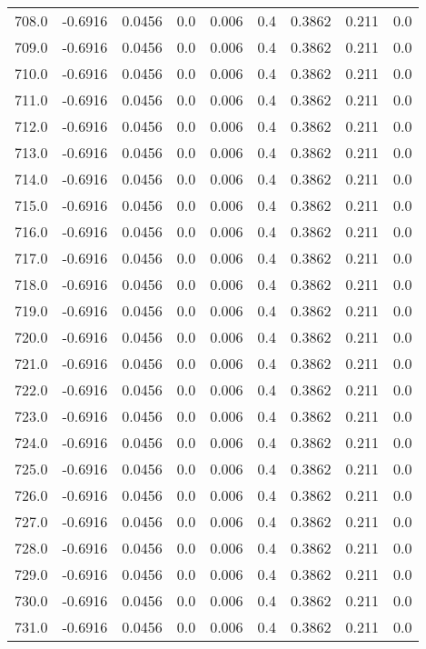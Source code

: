\begin{longtable}{lrrrrrrrr}
708.0 & -0.6916 & 0.0456 & 0.0 & 0.006 & 0.4 & 0.3862 & 0.211 & 0.0 \\
709.0 & -0.6916 & 0.0456 & 0.0 & 0.006 & 0.4 & 0.3862 & 0.211 & 0.0 \\
710.0 & -0.6916 & 0.0456 & 0.0 & 0.006 & 0.4 & 0.3862 & 0.211 & 0.0 \\
711.0 & -0.6916 & 0.0456 & 0.0 & 0.006 & 0.4 & 0.3862 & 0.211 & 0.0 \\
712.0 & -0.6916 & 0.0456 & 0.0 & 0.006 & 0.4 & 0.3862 & 0.211 & 0.0 \\
713.0 & -0.6916 & 0.0456 & 0.0 & 0.006 & 0.4 & 0.3862 & 0.211 & 0.0 \\
714.0 & -0.6916 & 0.0456 & 0.0 & 0.006 & 0.4 & 0.3862 & 0.211 & 0.0 \\
715.0 & -0.6916 & 0.0456 & 0.0 & 0.006 & 0.4 & 0.3862 & 0.211 & 0.0 \\
716.0 & -0.6916 & 0.0456 & 0.0 & 0.006 & 0.4 & 0.3862 & 0.211 & 0.0 \\
717.0 & -0.6916 & 0.0456 & 0.0 & 0.006 & 0.4 & 0.3862 & 0.211 & 0.0 \\
718.0 & -0.6916 & 0.0456 & 0.0 & 0.006 & 0.4 & 0.3862 & 0.211 & 0.0 \\
719.0 & -0.6916 & 0.0456 & 0.0 & 0.006 & 0.4 & 0.3862 & 0.211 & 0.0 \\
720.0 & -0.6916 & 0.0456 & 0.0 & 0.006 & 0.4 & 0.3862 & 0.211 & 0.0 \\
721.0 & -0.6916 & 0.0456 & 0.0 & 0.006 & 0.4 & 0.3862 & 0.211 & 0.0 \\
722.0 & -0.6916 & 0.0456 & 0.0 & 0.006 & 0.4 & 0.3862 & 0.211 & 0.0 \\
723.0 & -0.6916 & 0.0456 & 0.0 & 0.006 & 0.4 & 0.3862 & 0.211 & 0.0 \\
724.0 & -0.6916 & 0.0456 & 0.0 & 0.006 & 0.4 & 0.3862 & 0.211 & 0.0 \\
725.0 & -0.6916 & 0.0456 & 0.0 & 0.006 & 0.4 & 0.3862 & 0.211 & 0.0 \\
726.0 & -0.6916 & 0.0456 & 0.0 & 0.006 & 0.4 & 0.3862 & 0.211 & 0.0 \\
727.0 & -0.6916 & 0.0456 & 0.0 & 0.006 & 0.4 & 0.3862 & 0.211 & 0.0 \\
728.0 & -0.6916 & 0.0456 & 0.0 & 0.006 & 0.4 & 0.3862 & 0.211 & 0.0 \\
729.0 & -0.6916 & 0.0456 & 0.0 & 0.006 & 0.4 & 0.3862 & 0.211 & 0.0 \\
730.0 & -0.6916 & 0.0456 & 0.0 & 0.006 & 0.4 & 0.3862 & 0.211 & 0.0 \\
731.0 & -0.6916 & 0.0456 & 0.0 & 0.006 & 0.4 & 0.3862 & 0.211 & 0.0 \\

\end{longtable}
